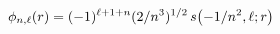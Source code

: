 \[\phi_{n,\ell}(r)=(-1)^{\ell+1+n}(2/n^{3})^{1/2}\mathop{s\/}\nolimits\!\left(-1%
/n^{2},\ell;r\right)\]